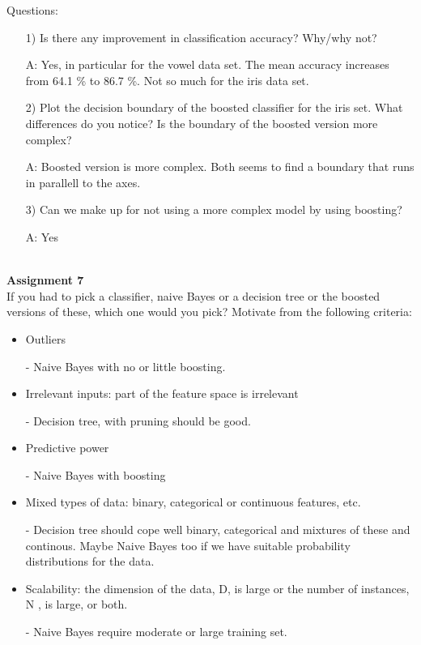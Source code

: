 \documentclass[a4paper,10pt]{article}
\begin{document}
\newpage
\noindent
Questions:
\begin{itemize}
  \item[1)] Is there any improvement in classification accuracy? Why/why not?
  \item[A:] Yes, in particular for the vowel data set. The mean accuracy increases from
    64.1 \% to 86.7 \%. Not so much for the iris data set. 
  \item[2)] Plot the decision boundary of the boosted classifier for the iris set.
    What differences do you notice? Is the boundary of the boosted version more
    complex?
  \item[A:] Boosted version is more complex. Both seems to find a boundary that runs
    in parallell to the axes.
  \item[3)] Can we make up for not using a more complex model by using boosting?
  \item[A:] Yes
\end{itemize}






$ $\\
\textbf{Assignment 7}
\\
If you had to pick a classifier, naive Bayes or a decision tree or
the boosted versions of these, which one would you pick? Motivate from the following
criteria:
\begin{itemize}
  \item Outliers
  \item[-] Naive Bayes with no or little boosting.
  \item Irrelevant inputs: part of the feature space is irrelevant
  \item[-] Decision tree, with pruning should be good.
  \item Predictive power
  \item[-] Naive Bayes with boosting
  \item Mixed types of data: binary, categorical or continuous features, etc.
  \item[-] Decision tree should cope well binary, categorical and mixtures of these and 
    continous. Maybe Naive Bayes too if we have suitable probability distributions for the 
    data.
  \item Scalability: the dimension of the data, D, is large or the number of instances,
    N , is large, or both.
  \item[-] Naive Bayes require moderate or large training set.
\end{itemize}
\end{document}
